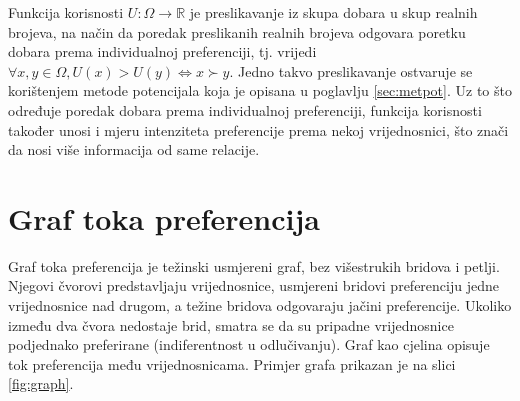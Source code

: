 \documentclass[lmodern, utf8, diplomski, numeric]{fer}
\begin{document}
  Funkcija korisnosti $U\colon \Omega \to \mathbb{R}$ je preslikavanje iz skupa dobara u skup realnih brojeva, na način da poredak preslikanih realnih brojeva odgovara poretku dobara prema individualnoj preferenciji, tj. vrijedi $\forall x, y \in \Omega, U(x) > U(y) \Leftrightarrow x \succ y$.
  Jedno takvo preslikavanje ostvaruje se korištenjem metode potencijala koja je opisana u poglavlju \ref{sec:metpot}.
  Uz to što određuje poredak dobara prema individualnoj preferenciji, funkcija korisnosti također unosi i mjeru intenziteta preferencije prema nekoj vrijednosnici, što znači da nosi više informacija od same relacije.

  \section{Graf toka preferencija}
  
  Graf toka preferencija je težinski usmjereni graf, bez višestrukih bridova i petlji.
  Njegovi čvorovi predstavljaju vrijednosnice, usmjereni bridovi preferenciju jedne vrijednosnice nad drugom, a težine bridova odgovaraju jačini preferencije.
  Ukoliko između dva čvora nedostaje brid, smatra se da su pripadne vrijednosnice podjednako preferirane (indiferentnost u odlučivanju).
  Graf kao cjelina opisuje tok preferencija među vrijednosnicama.
  Primjer grafa prikazan je na slici \ref{fig:graph}.
  
\end{document}
